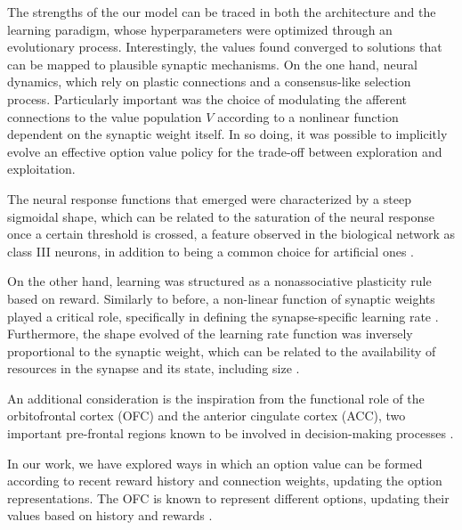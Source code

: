 The strengths of the our model can be traced in both the architecture and the learning paradigm, whose hyperparameters were optimized through an evolutionary process. Interestingly, the values found converged to solutions that can be mapped to plausible synaptic mechanisms.
On the one hand, neural dynamics, which rely on plastic connections and a consensus-like selection process.
Particularly important was the choice of modulating the afferent connections to the value population $V$ according to a nonlinear function dependent on the synaptic weight itself. In so doing, it was possible to implicitly evolve an effective option value policy for the trade-off between exploration and exploitation.

The neural response functions that emerged were characterized by a steep sigmoidal shape, which can be related to the saturation of the neural response once a certain threshold is crossed, a feature observed in the biological network as class III neurons, in addition to being a common choice for artificial ones \cite{ratteImpactNeuronalProperties2013, ockerFlexibleNeuralConnectivity2020, apicellaSurveyModernTrainable2021}.

On the other hand, learning was structured as a nonassociative plasticity rule based on reward. Similarly to before, a non-linear function of synaptic weights played a critical role, specifically in defining the synapse-specific learning rate \cite{larsenSynapsetypespecificPlasticityLocal2015}.
Furthermore, the shape evolved of the learning rate function was inversely proportional to the synaptic weight, which can be related to the availability of resources in the synapse and its state, including size \cite{bartolHippocampalSpineHead2015, arielIntrinsicVariabilityPv2012}.

An additional consideration is the inspiration from the functional role of the orbitofrontal cortex (OFC) and the anterior cingulate cortex (ACC), two important pre-frontal regions known to be involved in decision-making processes \cite{kennerleyDecisionMakingReward2011, khamassiChapter22Medial2013}.

In our work, we have explored ways in which an option value can be formed according to recent reward history and connection weights, updating the option representations.
The OFC is known to represent different options, updating their values based on history and rewards \cite{lukChoiceCodingFrontal2013, kennerleyDecisionMakingReward2011, klein-fluggeSegregatedEncodingReward2013}.

